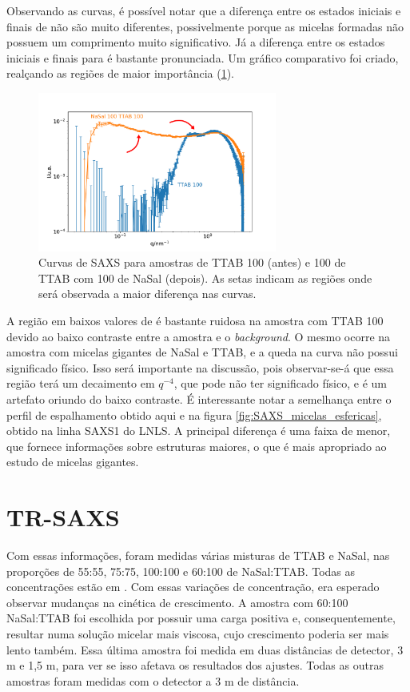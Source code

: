 	Observando as curvas, é possível notar que a diferença entre os estados iniciais e finais de \DTAB{} não são muito diferentes, possivelmente porque as micelas formadas não possuem um comprimento muito significativo. Já a diferença entre os estados iniciais e finais para \TTAB{} é bastante pronunciada. Um gráfico comparativo foi criado, realçando as regiões de maior importância (\ref{fig:tr_comparacao_ttab}).
	
	\begin{figure}[h]
		\centering
		\includegraphics[width=0.7\textwidth]{imagens/saxs/tr_comparacao_antes_depois}
		\caption{Curvas de SAXS para amostras de TTAB 100\mM{} (antes) e 100 \mM de TTAB com 100 \mM{} de NaSal (depois). As setas indicam as regiões onde será observada a maior diferença nas curvas.}
		\label{fig:tr_comparacao_ttab}
	\end{figure}
	
	A região em baixos valores de \q{} é bastante ruidosa na amostra com TTAB 100 \mM{} devido ao baixo contraste entre a amostra e o \emph{background}. O mesmo ocorre na amostra com micelas gigantes de NaSal e TTAB, e a queda na curva não possui significado físico. Isso será importante na discussão, pois observar-se-á que essa região terá um decaimento em \(q^{-4}\), que pode não ter significado físico, e é um artefato oriundo do baixo contraste. É interessante notar a semelhança entre o perfil de espalhamento obtido aqui e na figura \ref{fig:SAXS_micelas_esfericas}, obtido na linha SAXS1 do LNLS. A principal diferença é uma faixa de \q{} menor, que fornece informações sobre estruturas maiores, o que é mais apropriado ao estudo de micelas gigantes.
	
	\section{TR-SAXS}
	
	Com essas informações, foram medidas várias misturas de TTAB e NaSal, nas proporções de 55:55, 75:75, 100:100 e 60:100 de NaSal:TTAB. Todas as concentrações estão em \mM. Com essas variações de concentração, era esperado observar mudanças na cinética de crescimento. A amostra com 60:100 NaSal:TTAB foi escolhida por possuir uma carga positiva e, consequentemente, resultar numa solução micelar mais viscosa, cujo crescimento poderia ser mais lento também. Essa última amostra foi medida em duas distâncias de detector, 3 m e 1,5 m, para ver se isso afetava os resultados dos ajustes. Todas as outras amostras foram medidas com o detector a 3 m de distância.
	
